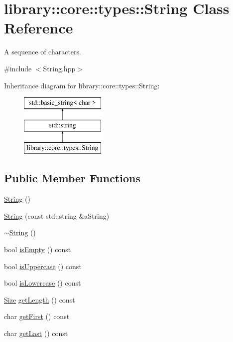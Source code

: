 \hypertarget{classlibrary_1_1core_1_1types_1_1_string}{}\section{library\+:\+:core\+:\+:types\+:\+:String Class Reference}
\label{classlibrary_1_1core_1_1types_1_1_string}


A sequence of characters.  




{\ttfamily \#include $<$String.\+hpp$>$}

Inheritance diagram for library\+:\+:core\+:\+:types\+:\+:String\+:\begin{figure}[H]
\begin{center}
\leavevmode
\includegraphics[height=3.000000cm]{classlibrary_1_1core_1_1types_1_1_string}
\end{center}
\end{figure}
\subsection*{Public Member Functions}
\begin{DoxyCompactItemize}
\item 
\hyperlink{classlibrary_1_1core_1_1types_1_1_string_ab49dec039a75f0049c95759141b6d484}{String} ()
\item 
\hyperlink{classlibrary_1_1core_1_1types_1_1_string_a37c737528805786c49eab397ba7b64ae}{String} (const std\+::string \&a\+String)
\item 
\hyperlink{classlibrary_1_1core_1_1types_1_1_string_a97f9b0024a58372a0281b25e2811f3bf}{$\sim$\+String} ()
\item 
bool \hyperlink{classlibrary_1_1core_1_1types_1_1_string_a1981fee5619389b46c786afa7aadc251}{is\+Empty} () const
\item 
bool \hyperlink{classlibrary_1_1core_1_1types_1_1_string_a6d12c373b22a062cfa0270204fc998f5}{is\+Uppercase} () const
\item 
bool \hyperlink{classlibrary_1_1core_1_1types_1_1_string_a3620d335dd5b14029a3a67e75c79be81}{is\+Lowercase} () const
\item 
\hyperlink{namespacelibrary_1_1core_1_1types_a701626ea1027888ebbb8cfd0ff7adab0}{Size} \hyperlink{classlibrary_1_1core_1_1types_1_1_string_adc97f82ccc9a3d034bc3127e643199fb}{get\+Length} () const
\item 
char \hyperlink{classlibrary_1_1core_1_1types_1_1_string_ad695264b765448ecf4f8617553012eee}{get\+First} () const
\item 
char \hyperlink{classlibrary_1_1core_1_1types_1_1_string_aae3aaf5e3b3fde3f7b90fd1ee431c9d4}{get\+Last} () const
\end{DoxyCompactItemize}

